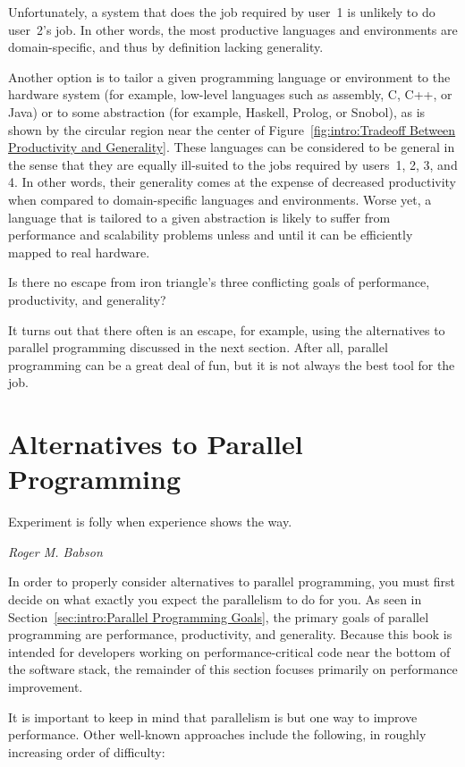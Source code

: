 Unfortunately, a system that does the job required by user~1 is
unlikely to do user~2's job.
In other words, the most productive languages and environments are
domain-specific, and thus by definition lacking generality.

Another option is to tailor a given programming language or environment
to the hardware system (for example, low-level languages such as
assembly, C, C++, or Java) or to some abstraction (for example,
Haskell, Prolog, or Snobol), as is shown by the circular region near
the center of
Figure~\ref{fig:intro:Tradeoff Between Productivity and Generality}.
These languages can be considered to be general in the sense that they
are equally ill-suited to the jobs required by users~1, 2, 3, and 4.
In other words, their generality comes at the expense of
decreased productivity when compared to domain-specific languages
and environments.
Worse yet, a language that is tailored to a given abstraction
is likely to suffer from performance and scalability problems
unless and until it can be efficiently mapped to real hardware.

Is there no escape from iron triangle's three conflicting goals of
performance, productivity, and generality?

It turns out that there often is an escape, for example,
using the alternatives to parallel programming discussed in the next section.
After all, parallel programming can be a great deal of fun, but
it is not always the best tool for the job.

\section{Alternatives to Parallel Programming}
\label{sec:intro:Alternatives to Parallel Programming}
%
\epigraph{Experiment is folly when experience shows the way.}
	 {\emph{Roger M. Babson}}

In order to properly consider alternatives to parallel programming,
you must first decide on what exactly you expect the parallelism
to do for you.
As seen in Section~\ref{sec:intro:Parallel Programming Goals},
the primary goals of parallel programming are performance, productivity,
and generality.
Because this book is intended for developers working on
performance-critical code near the bottom of the software stack,
the remainder of this section focuses primarily on performance improvement.

It is important to keep in mind that parallelism is but one way to
improve performance.
Other well-known approaches include the following, in roughly increasing
order of difficulty:


